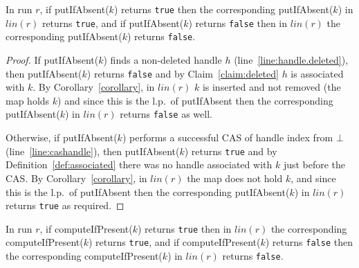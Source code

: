 \begin{claim}[PutIfAbsent]
In run $r$, if putIfAbsent($k$) returns \texttt{true} then the corresponding putIfAbsent($k$) in $lin(r)$ returns \texttt{true}, and if putIfAbsent($k$) returns \texttt{false} then in $lin(r)$ the corresponding putIfAbsent($k$) returns \texttt{false}.
\end{claim}

\begin{proof}
If putIfAbsent($k$) finds a non-deleted handle $h$ (line~\ref{line:handle.deleted}), then putIfAbsent($k$) returns \texttt{false} and by Claim~\ref{claim:deleted} $h$ is associated with $k$. 
By Corollary~\ref{corollary}, in $lin(r)$ $k$ is inserted and not removed (the map holds $k$) and since this is the l.p.\ of putIfAbsent then the corresponding putIfAbsent($k$) in $lin(r)$ returns \texttt{false} as well.

Otherwise, if putIfAbsent($k$) performs a successful CAS of handle index from $\bot$ (line~\ref{line:cashandle}), then putIfAbsent($k$) returns \texttt{true} and by Definition~\ref{def:associated} there was no handle associated with $k$ just before the CAS. 
By Corollary~\ref{corollary}, in $lin(r)$ the map does not hold $k$, and since this is the l.p.\ of putIfAbsent then the corresponding putIfAbsent($k$) in $lin(r)$ returns \texttt{true} as required.
\end{proof}

\begin{claim}[ComputeIfPresent]
In run $r$, if computeIfPresent($k$) returns \texttt{true} then in $lin(r)$ the corresponding \newline computeIfPresent($k$) returns \texttt{true}, and if computeIfPresent($k$) returns \texttt{false} then the corresponding computeIfPresent($k$) in $lin(r)$ returns \texttt{false}.
\end{claim}

